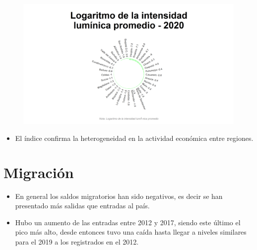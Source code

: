     \begin{figure}[H]
        \caption[Logaritmo de la intensidad lumínica promedio por departamentos para 2020 ]{\label{log_lumicidad_dptos} }
        \begin{center}
        \includegraphics[width=\textwidth,keepaspectratio]{img/var_301_static.png}
        \end{center}
    \end{figure}
            \begin{itemize}
                    \item El índice confirma la heterogeneidad en la actividad económica entre regiones. 
                    \end{itemize}

\section{Migración}

    \begin{tcolorbox}[enhanced, colback=mycolor,colframe=mycolor,drop fuzzy shadow,watermark color=white,
                        title=Principales Resultados]
    
            \begin{itemize}
                    \item En general los saldos migratorios han sido negativos, es decir se han presentado más salidas que entradas al país.
                    \item Hubo un aumento de las entradas entre 2012 y 2017, siendo este último el pico más alto, desde entonces tuvo una caída hasta llegar a niveles similares para el 2019 a los registrados en el 2012.
                    \end{itemize}

     
    \end{tcolorbox}
    
